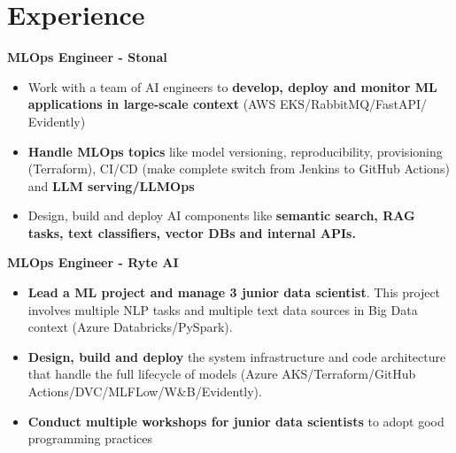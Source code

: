 \documentclass[a4paper,10pt]{article}
\begin{document}
\begin{adjustbox}{valign=t}
    \begin{minipage}{0.6\textwidth}
        \vspace{.5cm}
        \section*{Experience}
        \vspace{-.3cm}
        \begin{description}
            \raggedright
            \item[\normalfont \textcolor{ColorOne}{Since Jan. 2024}]
                \textbf{MLOps Engineer - Stonal}\\
                \small
                \begin{itemize}[topsep=0pt]
                    \item Work with a team of AI engineers to \textbf{develop, deploy and monitor ML applications in large-scale context} (AWS EKS/RabbitMQ/FastAPI/\\Evidently)
                    \item \textbf{Handle MLOps topics} like model versioning, reproducibility, provisioning (Terraform), CI/CD (make complete switch from Jenkins to GitHub Actions) and \textbf{LLM serving/LLMOps}
                    \item Design, build and deploy AI components like \textbf{semantic search, RAG tasks, text classifiers, vector DBs and internal APIs.}
                \end{itemize}
                \normalsize
            \item[\normalfont \textcolor{ColorOne}{Oct. 2023 -- Jan. 2024}]
                \textbf{MLOps Engineer - Ryte AI}\\
                \small
                \begin{itemize}[topsep=0pt]
                    \item \textbf{Lead a ML project and manage 3 junior data scientist}. This project involves multiple NLP tasks and multiple text data sources in Big Data context (Azure Databricks/PySpark).
                    \item \textbf{Design, build and deploy} the system infrastructure and code architecture that handle the full lifecycle of models (Azure AKS/Terraform/GitHub Actions/DVC/MLFLow/W\&B/Evidently).
                    \item \textbf{Conduct multiple workshops for junior data scientists} to adopt good programming practices

\end{itemize}
\end{description}
\end{minipage}
\end{adjustbox}
\end{document}
